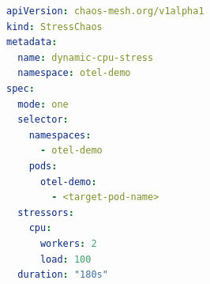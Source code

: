 \begin{lstlisting}[language=Yaml, caption={Dynamic CPU Stress Chaos Manifest (\texttt{cpu-stress})}, label={code:stress-chaos}]
apiVersion: chaos-mesh.org/v1alpha1
kind: StressChaos
metadata:
  name: dynamic-cpu-stress
  namespace: otel-demo
spec:
  mode: one
  selector:
    namespaces:
      - otel-demo
    pods:
      otel-demo:
        - <target-pod-name>
  stressors:
    cpu:
      workers: 2
      load: 100
  duration: "180s"
\end{lstlisting}
